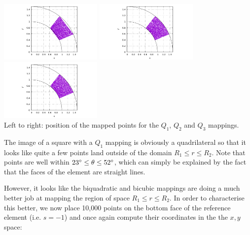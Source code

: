 \begin{center}
\includegraphics[width=5cm]{images/mappings/curved/xy1_keep.pdf}
\includegraphics[width=5cm]{images/mappings/curved/xy2_keep.pdf}
\includegraphics[width=5cm]{images/mappings/curved/xy3_keep.pdf}\\
{\captionfont Left to right: position of the mapped points for the $Q_1$, $Q_2$ and $Q_3$ mappings.}
\end{center}

The image of a square with a $Q_1$ mapping is obviously a quadrilateral
so that it looks like quite a few points land outside of the domain $R_1\leq r\leq R_2$.
Note that points are well within $23\degree \leq \theta \leq 52\degree$, which can 
simply be explained by the fact that the faces of the element are straight lines.

However, it looks like the biquadratic and bicubic mappings are doing a much better 
job at mapping the region of space $R_1\leq r\leq R_2$. In order to characterise 
this better, we now place 10,000 points on the bottom face of the reference element (i.e. $s=-1$)
and once again compute their coordinates in the the $x,y$ space:

